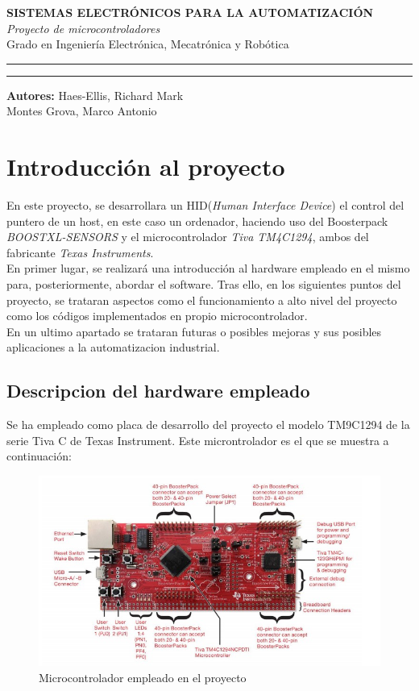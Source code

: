 \documentclass[a4paper,twoside]{article}
\begin{document}
\begin{titlepage}
 \centering
 \Huge{\textbf{SISTEMAS ELECTRÓNICOS PARA LA AUTOMATIZACIÓN}} \\
 \Huge{\textit{Proyecto de microcontroladores}}\\

 \vspace{1cm}
 \LARGE{Grado en Ingeniería Electrónica, Mecatrónica y Robótica}\\
 \rule{\textwidth}{0.1mm}

 \vspace{2cm}
 \rule{\textwidth}{0.1mm}
 \Large{\textbf{Autores:} Haes-Ellis, Richard Mark\\
 Montes Grova, Marco Antonio}
\end{titlepage}
\tableofcontents
\newpage

\section{Introducción al proyecto}
En este proyecto, se desarrollara un HID(\textit{Human Interface Device}) el control del puntero de un host, en este caso un ordenador, haciendo  uso del Boosterpack \textit{BOOSTXL-SENSORS} y el microcontrolador \textit{Tiva TM4C1294}, ambos del fabricante \textit{Texas Instruments}.\\
En primer lugar, se realizará una introducción al hardware empleado en el mismo para, posteriormente, abordar el software. Tras ello, en los siguientes puntos del proyecto, se trataran aspectos como el funcionamiento a alto nivel del proyecto como los códigos implementados en propio microcontrolador.\\
En un ultimo apartado se trataran futuras o posibles mejoras y sus posibles aplicaciones a la automatizacion industrial.
\subsection{Descripcion del hardware empleado}
Se ha empleado como placa de desarrollo del proyecto el modelo TM9C1294 de la serie Tiva C de Texas Instrument. Este microntrolador es el que se muestra a continuación: \\
 \begin{figure}[h!]
	\centering
	\includegraphics[width=.7\textwidth]{../images/tiva_tm4c1294}
  \caption{Microcontrolador empleado en el proyecto}
\end{figure}
\end{document}

